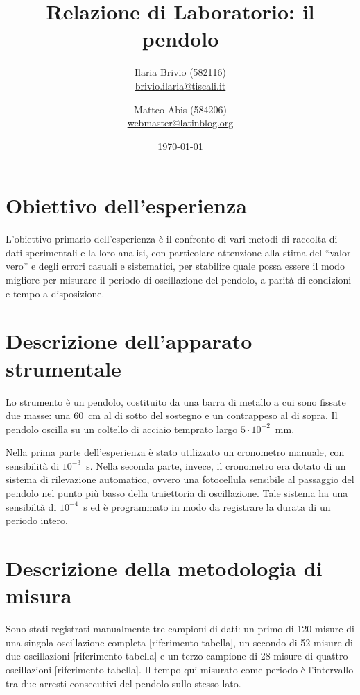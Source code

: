 \documentclass[italian,a4paper,10pt]{article}
\theoremstyle{definition}
\begin{document}
\title{Relazione di Laboratorio: il pendolo}
\author{\normalsize Ilaria Brivio (582116)\\%
\normalsize \url{brivio.ilaria@tiscali.it}%
\and %
\normalsize Matteo Abis (584206)\\ %
\normalsize \url{webmaster@latinblog.org}}
\date{\today}
\maketitle
\section{Obiettivo dell'esperienza}
L'obiettivo primario dell'esperienza è il confronto di vari metodi di raccolta di dati sperimentali e la loro analisi, con particolare attenzione alla stima del ``valor vero'' e degli errori casuali e sistematici, per stabilire quale possa essere il modo migliore per misurare il periodo di oscillazione del pendolo, a parità di condizioni e tempo a disposizione.
\section{Descrizione dell'apparato strumentale}
Lo strumento è un pendolo, costituito da una barra di metallo a cui sono fissate due masse: una $60$~cm al di sotto del sostegno e un contrappeso al di sopra. Il pendolo oscilla su un coltello di acciaio temprato largo $5\cdot10^{-2}$~mm.

Nella prima parte dell'esperienza è stato utilizzato un cronometro manuale, con sensibilità di $10^{-3}$~s. Nella seconda parte, invece, il cronometro era dotato di un sistema di rilevazione automatico, ovvero una fotocellula sensibile al passaggio del pendolo nel punto più basso della traiettoria di oscillazione. Tale sistema ha una sensibiltà di $10^{-4}$~s ed è programmato in modo da registrare la durata di un periodo intero.
\section{Descrizione della metodologia di misura}
Sono stati registrati manualmente tre campioni di dati: un primo di 120 misure di una singola oscillazione completa [riferimento tabella], un secondo di 52 misure di due oscillazioni [riferimento tabella] e un terzo campione di 28 misure di quattro oscillazioni [riferimento tabella]. Il tempo qui misurato come periodo è l'intervallo tra due arresti consecutivi del pendolo sullo stesso lato.
\end{document}
